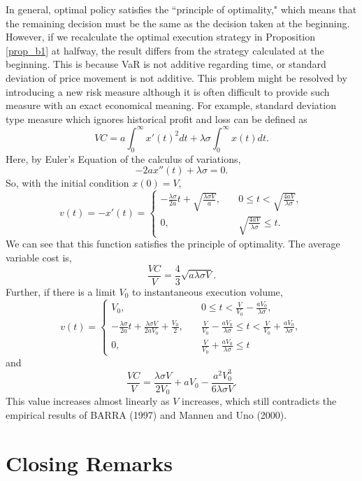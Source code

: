  In general, optimal policy satisfies the ``principle of optimality," which means that the remaining decision must be the same as the decision taken at the beginning.  However, if we recalculate the optimal execution strategy in Proposition \ref{prop_b1} at halfway, the result differs from the strategy calculated at the beginning.  This is because VaR is not additive regarding time, or standard deviation of price movement is not additive.  This problem might be resolved by introducing a new risk measure although it is often difficult to provide such measure with an exact economical meaning.  For example, standard deviation type measure which ignores historical profit and loss can be defined as
\[
  VC = a \int_0^\infty x'(t)^2 dt + \lambda \sigma \int_0^\infty x(t) dt.
\]
 Here, by Euler's Equation of the calculus of variations,
\[
  -2ax''(t) + \lambda \sigma = 0.
\]
 So, with the initial condition $x(0)=V$,
\[
  v(t) = -x'(t) = \left\{
  \begin{array}{ll}
   - \frac{\lambda \sigma}{2a}t + \sqrt{\frac{\lambda \sigma V}{a}},
     & \quad 0 \leq t < \sqrt{\frac{4aV}{\lambda\sigma}}, \\
   0, & \quad \sqrt{\frac{4aV}{\lambda\sigma}} \leq t.
  \end{array}
  \right.
\]
 We can see that this function satisfies the principle of optimality.
 The average variable cost is,
\[
  \frac{VC}{V} = \frac{4}{3} \sqrt{a \lambda \sigma V}.
\]
 Further, if there is a limit $V_0$ to instantaneous execution volume,
\[
  v(t) = \left\{
  \begin{array}{ll}
   V_0, & \quad 0 \leq t < \frac{V}{V_0}-\frac{aV_0}{\lambda \sigma}, \\
   -\frac{\lambda\sigma}{2a}t + \frac{\lambda\sigma V}{2aV_0} + \frac{V_0}{2},
       & \quad \frac{V}{V_0}-\frac{aV_0}{\lambda \sigma} \leq t < \frac{V}{V_0}+
         \frac{aV_0}{\lambda \sigma}, \\
   0, & \quad  \frac{V}{V_0}+\frac{aV_0}{\lambda \sigma} \leq t
  \end{array}
  \right.
\]
and
\[
  \frac{VC}{V} = \frac{\lambda\sigma V}{2V_0} + aV_0 - \frac{a^2V_0^3}{6\lambda\sigma V}.
\]
 This value increases almost linearly as $V$ increases, which still contradicts the empirical results
of BARRA (1997) and Mannen and Uno (2000).

\section{Closing Remarks}\label{sec_b6}

